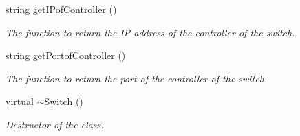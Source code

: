 \begin{DoxyCompactItemize}
string \hyperlink{classSwitch_af11e69a311d13705bc6799a56a980b4c}{get\-I\-Pof\-Controller} ()
\begin{DoxyCompactList}\small\item\em \-The function to return the \-I\-P address of the controller of the switch. \end{DoxyCompactList}\item 
string \hyperlink{classSwitch_adc27b9def7bfc56b52411a20a6cca4b9}{get\-Portof\-Controller} ()
\begin{DoxyCompactList}\small\item\em \-The function to return the port of the controller of the switch. \end{DoxyCompactList}\item 
\hypertarget{classSwitch_ac9e0d5810af5ea21572d5dd7248baed8}{virtual \hyperlink{classSwitch_ac9e0d5810af5ea21572d5dd7248baed8}{$\sim$\-Switch} ()}\label{classSwitch_ac9e0d5810af5ea21572d5dd7248baed8}

\begin{DoxyCompactList}\small\item\em \-Destructor of the class. \end{DoxyCompactList}\end{DoxyCompactItemize}
